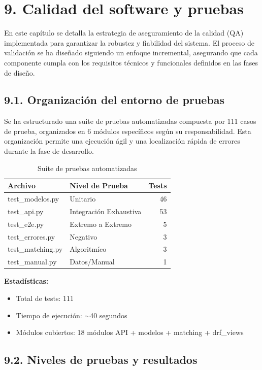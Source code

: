 \section*{9. Calidad del software y pruebas}

En este capítulo se detalla la estrategia de aseguramiento de la 
calidad (QA) implementada para garantizar la robustez y fiabilidad 
del sistema. El proceso de validación se ha diseñado siguiendo un 
enfoque incremental, asegurando que cada componente cumpla con los 
requisitos técnicos y funcionales definidos en las fases de diseño.


\subsection{9.1. Organización del entorno de pruebas}

Se ha estructurado una suite de pruebas automatizadas compuesta por 
111 casos de prueba, organizados en 6 módulos específicos según su 
responsabilidad. Esta organización permite una ejecución ágil y una 
localización rápida de errores durante la fase de desarrollo.

\begin{table}[H]
\centering
\small
\begin{tabular}{|l|l|r|}
\hline
\textbf{Archivo} & \textbf{Nivel de Prueba} & 
\textbf{Tests} \\
\hline
test\_modelos.py & Unitario & 46 \\
test\_api.py & Integración Exhaustiva & 53 \\
test\_e2e.py & Extremo a Extremo & 5 \\
test\_errores.py & Negativo & 3 \\
test\_matching.py & Algoritmíco & 3 \\
test\_manual.py & Datos/Manual & 1 \\
\hline
\end{tabular}
\caption{Suite de pruebas automatizadas}
\end{table}

\noindent\textbf{Estadísticas:}
\begin{itemize}
  \item Total de tests: 111
  \item Tiempo de ejecución: $\sim$40 segundos
  \item Módulos cubiertos: 18 módulos API + modelos + matching 
        + drf\_views
\end{itemize}


\subsection{9.2. Niveles de pruebas y resultados}


